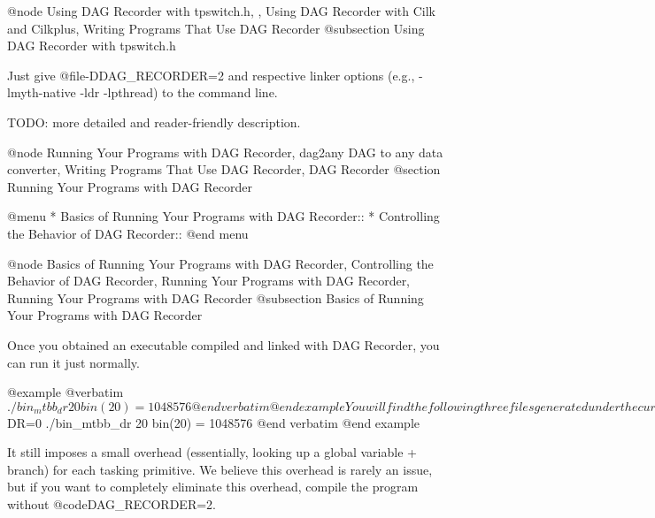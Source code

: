 @node Using DAG Recorder with tpswitch.h,  , Using DAG Recorder with Cilk and Cilkplus, Writing Programs That Use DAG Recorder
@subsection Using DAG Recorder with tpswitch.h

Just give @file{-DDAG_RECORDER=2} 
and respective linker options (e.g., -lmyth-native -ldr -lpthread)
to the command line.

TODO: more detailed and reader-friendly description.

@node Running Your Programs with DAG Recorder, dag2any DAG to any data converter, Writing Programs That Use DAG Recorder, DAG Recorder
@section Running Your Programs with DAG Recorder

@menu
* Basics of Running Your Programs with DAG Recorder::
* Controlling the Behavior of DAG Recorder::
@end menu

@node Basics of Running Your Programs with DAG Recorder, Controlling the Behavior of DAG Recorder, Running Your Programs with DAG Recorder, Running Your Programs with DAG Recorder
@subsection Basics of Running Your Programs with DAG Recorder

Once you obtained an executable compiled and linked with DAG Recorder, you can run it just normally.  

@example 
@verbatim
$ ./bin_mtbb_dr 20
bin(20) = 1048576
@end verbatim
@end example

You will find the following three files generated under the current directory.
@itemize @bullet
@item @file{00dr.dag} --- The DAG file. This is the primary file generated by DAG Recorder, from which other files are derived
@item @file{00dr.gpl} --- The parallelism file.  This is a file showing the actual and available parallelism, in a gnuplot format. 
@item @file{00dr.stat} --- The summary stat file.  This is a text file showing, among others, the number of tasks, total work time (time spent in the application code), critical path, the number of steals, etc.  The contents of this file will be explained later.
@end itemize

Run this program with setting environemnt variable @code{DR=0}, and you
can run the program with DAG Recorder turned off.

@example 
@verbatim
$ DR=0 ./bin_mtbb_dr 20
bin(20) = 1048576
@end verbatim
@end example

It still imposes a small overhead (essentially, looking up a global
variable + branch) for each tasking primitive.  We believe this overhead
is rarely an issue, but if you want to completely eliminate this
overhead, compile the program without @code{DAG_RECORDER=2}.

